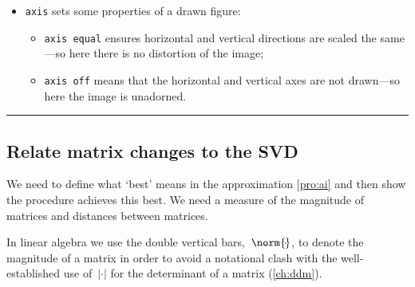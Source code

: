 \begin{table}
\begin{minipage}{\linewidth}
\begin{itemize}

\item {}\verb|axis| sets some properties of a drawn figure:
\begin{itemize}
\item \verb|axis equal| ensures horizontal and vertical directions are scaled the same---so here there is no distortion of the image;
\item \verb|axis off| means that the horizontal and vertical axes are not drawn---so here the image is unadorned.
\end{itemize}


\end{itemize}
\end{minipage}
\hrule
\end{table}








\subsection{Relate matrix changes to the SVD}
\label{sec:rmmsvd}


We need to define what `best' means in the approximation \autoref{pro:ai} and then show the procedure achieves this best.
We need a measure of the magnitude of matrices and distances between matrices.

In linear algebra we use the double vertical bars,~\(\norm{\cdot}\), to  denote the magnitude of a matrix in order to avoid a notational clash with the well-established use of~\(|\cdot|\) for the determinant of a matrix (\autoref{ch:ddm}).

